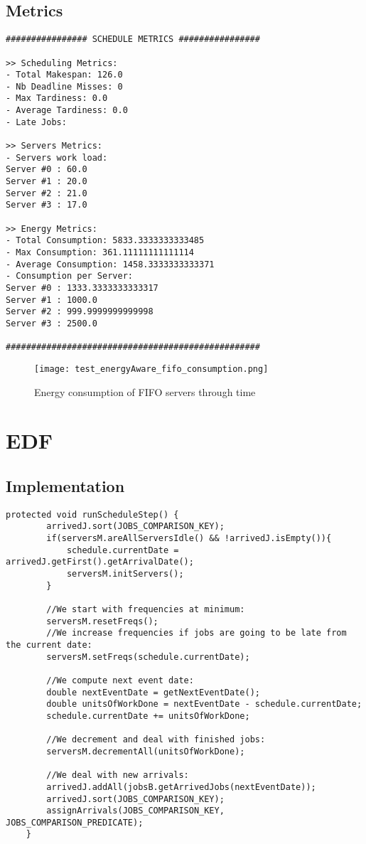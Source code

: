 \documentclass[./report.tex]{subfiles}
\begin{document}
\subsection{Metrics}
\begin{lstlisting}[style=txt, caption={Metrics for FIFO on multiple energy aware servers}]
################ SCHEDULE METRICS ################

>> Scheduling Metrics: 
- Total Makespan: 126.0
- Nb Deadline Misses: 0
- Max Tardiness: 0.0
- Average Tardiness: 0.0
- Late Jobs: 

>> Servers Metrics: 
- Servers work load:
Server #0 : 60.0
Server #1 : 20.0
Server #2 : 21.0
Server #3 : 17.0

>> Energy Metrics: 
- Total Consumption: 5833.3333333333485
- Max Consumption: 361.11111111111114
- Average Consumption: 1458.3333333333371
- Consumption per Server: 
Server #0 : 1333.3333333333317
Server #1 : 1000.0
Server #2 : 999.9999999999998
Server #3 : 2500.0

##################################################
\end{lstlisting}

\begin{figure}[!h]
	\center
	\hspace*{-5em} \texttt{[image: test\_energyAware\_fifo\_consumption.png]}
	\caption{Energy consumption of FIFO servers through time}
	\label{fig:fifo_consumption} 
\end{figure}


\newpage
\section{EDF}
\subsection{Implementation}

\begin{lstlisting}[style=Java, caption={Source code of an energy aware EDF adapted for multiple servers}]
	protected void runScheduleStep() {
		arrivedJ.sort(JOBS_COMPARISON_KEY);
		if(serversM.areAllServersIdle() && !arrivedJ.isEmpty()){
			schedule.currentDate = arrivedJ.getFirst().getArrivalDate();
			serversM.initServers();
		}
		
		//We start with frequencies at minimum:
		serversM.resetFreqs();
		//We increase frequencies if jobs are going to be late from the current date:
		serversM.setFreqs(schedule.currentDate);
		
		//We compute next event date:
		double nextEventDate = getNextEventDate();
		double unitsOfWorkDone = nextEventDate - schedule.currentDate;
		schedule.currentDate += unitsOfWorkDone;
		
		//We decrement and deal with finished jobs:
		serversM.decrementAll(unitsOfWorkDone);
		
		//We deal with new arrivals:
		arrivedJ.addAll(jobsB.getArrivedJobs(nextEventDate));
		arrivedJ.sort(JOBS_COMPARISON_KEY);
		assignArrivals(JOBS_COMPARISON_KEY, JOBS_COMPARISON_PREDICATE);
	}
\end{lstlisting}
\end{document}

